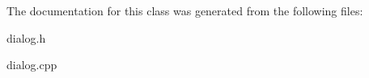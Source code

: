 The documentation for this class was generated from the following files\-:\begin{DoxyCompactItemize}
\item 
dialog.\-h\item 
dialog.\-cpp\end{DoxyCompactItemize}
